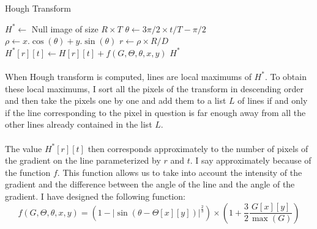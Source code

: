 \documentclass[11pt]{article}
\begin{document}
	\begin{algorithm}[h]
		\caption{Hough Transform}
		\label{alg:hough}
		\begin{algorithmic}
			\State $H^* \gets $ Null image of size $R \times T$
			\For{$(x, y) \in [0, W) \times [0; H) $ with $ G[x][y] > 0$}
				\For{$t \in [0; T)$}
					\State $\theta \gets 3 \pi / 2 \times t / T - \pi / 2$
					\State $\rho \gets x . \cos(\theta) + y . \sin(\theta)$
						\State $r \gets \rho \times R / D$
						\State $H^*[r][t] \gets H[r][t] + f(G, \Theta, \theta, x, y)$
					\EndIf
				\EndFor
			\EndFor
			\State \Return $H^*$
			\EndFunction
		\end{algorithmic}
	\end{algorithm}

	\paragraph{}
	When Hough transform is computed, lines are local maximums of $H^*$. To obtain these local maximums, I sort all the pixels of the transform in descending order and then take the pixels one by one and add them to a list $L$ of lines if and only if the line corresponding to the pixel in question is far enough away from all the other lines already contained in the list $L$.
	
	\paragraph{}
	The value $H^*[r][t]$ then corresponds approximately to the number of pixels of the gradient on the line parameterized by $r$ and $t$. I say approximately because of the function $f$. This function allows us to take into account the intensity of the gradient and the difference between the angle of the line and the angle of the gradient. I have designed the following function:
	$$ f(G, \Theta, \theta, x, y) = \left( 1 - \left| \sin \left( \theta - \Theta[x][y] \right) \right|^{\frac{2}{3}}\right) \times \left( 1 + \frac{3}{2} \dfrac{G[x][y]}{\max (G)} \right) $$
	
\end{document}
